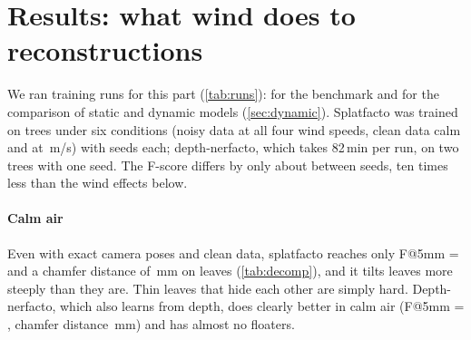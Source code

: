 \documentclass[preprint,11pt,authoryear]{elsarticle}
\begin{document}
\section{Results: what wind does to reconstructions}\label{sec:results}
We ran \NRunsTotal{} training runs for this part (\cref{tab:runs}): \NRunsBench{} for the benchmark and \NRunsStudy{} for the comparison of static and dynamic models (\cref{sec:dynamic}). Splatfacto was trained on \NResultTrees{} trees under six conditions (noisy data at all four wind speeds, clean data calm and at \WindMax\,m/s) with \NResultSeeds{} seeds each; depth-nerfacto, which takes 82\,min per run, on two trees with one seed. The F-score differs by only about \SpSeedStdF{} between seeds, ten times less than the wind effects below.

\begin{table}[!tbp]
\centering\small
\caption{All training runs of the benchmark.}
\label{tab:runs}
\resizebox{\linewidth}{!}{}
\end{table}

\begin{table}[!tbp]
\centering\small
\caption{Benchmark results (splatfacto: 4 trees, 2 seeds; depth-nerfacto: 2 trees, 1 seed). F@5mm, Prec., Rec.: leaf F-score, precision and recall within 5\,mm; CD: chamfer distance; Floaters: points more than 3\,cm from any surface.}
\label{tab:results}
\resizebox{\linewidth}{!}{}
\end{table}

\paragraph{Calm air} Even with exact camera poses and clean data, splatfacto reaches only F@5mm = \SpBaseF{} and a chamfer distance of \SpBaseCD\,mm on leaves (\cref{tab:decomp}), and it tilts leaves more steeply than they are. Thin leaves that hide each other are simply hard. Depth-nerfacto, which also learns from depth, does clearly better in calm air (F@5mm = \NfBaseF{}, chamfer distance \NfBaseCD\,mm) and has almost no floaters.
\end{document}
